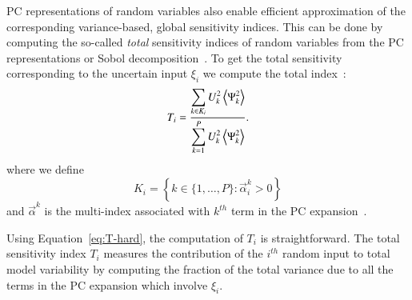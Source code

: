 PC representations of random variables also enable efficient
approximation of the corresponding variance-based, global
sensitivity indices. This can be done by computing the so-called {\it total} 
sensitivity indices of random variables from the PC representations or Sobol decomposition~\citep{Sobol:1993,Homma:1996,Sobol:2001}. To get the total sensitivity corresponding to the uncertain
input $\xi_i$ we compute the total index~\citep{LeMaitreKnio2010,Crestaux,Sudret}:
\begin{equation} \label{eq:T-hard}
   T_i =
         \frac{\displaystyle
               \sum_{k \in K_i} U_k^2 \left\langle {\Psi_k^2} \right\rangle}
              {\displaystyle\sum_{k = 1}^P U_k^2 \left\langle {\Psi_k^2} \right\rangle} .
\end{equation}
where we define \[
   K_i = \left\{ k \in \{1, \ldots, P\} :
           \vec{\alpha}^k_i > 0 \right\}
        \]
        and $\vec{\alpha}^k$ is the
multi-index associated with $k^{th}$ term in the
PC expansion~\cite{LeMaitreKnio2010}.

Using Equation~\eqref{eq:T-hard}, the computation of $T_i$ is straightforward.
The total sensitivity index $T_i$ measures the contribution of
the $i^{th}$ random input to total model variability by
computing the fraction of the total variance due to all the terms in the
PC expansion which involve $\xi_i$.


